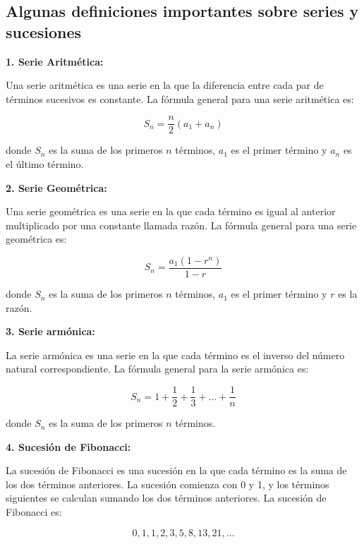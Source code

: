\documentclass[11pt, a4paper]{article}
\begin{document}
  \subsection{Algunas definiciones importantes sobre series y sucesiones}

  \begin{multicols}{2}
    \begin{center}
      \textbf{1. Serie Aritmética:}
    \end{center}
    Una serie aritmética es una serie en la que la diferencia entre cada par de términos sucesivos es constante. La fórmula general para una serie aritmética es:

    \[ S_n = \dfrac{n}{2}(a_1 + a_n) \]

    donde \( S_n \) es la suma de los primeros \( n \) términos, \( a_1 \) es el primer término y \( a_n \) es el último término.
    
    \begin{center}
      \textbf{2. Serie Geométrica:}
    \end{center}
    Una serie geométrica es una serie en la que cada término es igual al anterior multiplicado por una constante llamada razón. La fórmula general para una serie geométrica es:

    \[ S_n = \dfrac{a_1(1 - r^n)}{1 - r} \]

    donde \( S_n \) es la suma de los primeros \( n \) términos, \( a_1 \) es el primer término y \( r \) es la razón.
    
    \begin{center}
      \textbf{3. Serie armónica:}
    \end{center}
    La serie armónica es una serie en la que cada término es el inverso del número natural correspondiente. La fórmula general para la serie armónica es:

    \[ S_n = 1 + \dfrac{1}{2} + \dfrac{1}{3} + \dots + \dfrac{1}{n} \]

    donde \( S_n \) es la suma de los primeros \( n \) términos.

    \begin{center}
      \textbf{4. Sucesión de Fibonacci:}
    \end{center}
    La sucesión de Fibonacci es una sucesión en la que cada término es la suma de los dos términos anteriores. La sucesión comienza con 0 y 1, y los términos siguientes se calculan sumando los dos términos anteriores. La sucesión de Fibonacci es:

    \[ 0, 1, 1, 2, 3, 5, 8, 13, 21, \dots \]


\end{multicols}
\end{document}
